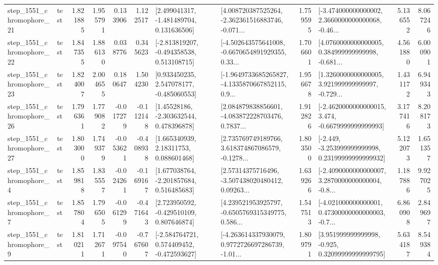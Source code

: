 \begin{tabular}{llrrrrllrlrr}
 step\_1551\_chromophore\_21 &      test &      1.821885 &    1.955791 &      0.133906 &  1.122517 &    [2.499041317, -1.481489704, 0.131636506] &  [4.008720387525264, -2.362361516883746, -0.071... &       1.759595 &  [-3.474000000000002, 2.3660000000000068, -0.46... &            5.136552 &          8.067246 \\
 step\_1551\_chromophore\_22 &      test &      1.847355 &    1.886130 &      0.038776 &  0.345623 &   [-2.813819207, -0.494358538, 0.513108715] &  [-4.502643575641008, -0.6670654891929355, 0.33... &       1.706601 &  [4.0760000000000005, 0.384999999999998, -0.681... &            4.561880 &          6.000901 \\
 step\_1551\_chromophore\_23 &      test &      1.824007 &    2.004655 &      0.180647 &  1.504230 &    [0.933450235, 2.547078177, -0.485060553] &  [-1.9649733685265827, -4.1335870667852115, 0.9... &       1.956678 &  [1.3260000000000005, 3.921999999999997, -0.729... &            1.431172 &          6.949343 \\
 step\_1551\_chromophore\_26 &      test &      1.796361 &    1.779082 &     -0.017279 & -0.112148 &     [1.45528186, -2.303632544, 0.478396878] &  [2.084879838856601, -4.083872228703476, 0.7837... &       1.912826 &  [-2.4620000000000015, 3.474, -0.6679999999999993] &            3.177416 &          8.208173 \\
 step\_1551\_chromophore\_27 &      test &      1.803000 &    1.749379 &     -0.053621 & -0.408938 &      [1.665340939, 2.18311753, 0.088601468] &  [2.735769749189766, 3.618374867086579, -0.1278... &       1.803500 &  [-2.449, -3.253999999999998, 0.23199999999999932] &            5.122073 &          1.651357 \\
  step\_1551\_chromophore\_4 &      test &      1.859818 &    1.835557 &     -0.024261 & -0.169167 &    [1.677038764, -2.201857684, 0.516485683] &  [2.57314375716496, -3.507438020480412, 0.09263... &       1.639266 &  [-2.4090000000000007, 3.2870000000000004, -0.8... &            1.187886 &          9.927025 \\
  step\_1551\_chromophore\_7 &      test &      1.857804 &    1.796505 &     -0.061299 & -0.471643 &    [2.723950592, -0.429510109, 0.807646874] &  [4.239521953925797, -0.6505769315349775, 0.586... &       1.547513 &  [-4.021000000000001, 0.47300000000000003, -0.7... &            6.860908 &          2.849697 \\
  step\_1551\_chromophore\_9 &      test &      1.810211 &    1.712671 &     -0.097540 & -0.767607 &   [-2.584764721, 0.574409452, -0.472593627] &  [-4.263614337930079, 0.9772726697286739, -1.01... &       1.809791 &   [3.951999999999998, -0.925, 0.32099999999999795] &            5.634187 &          8.549384 \\

\end{tabular}
